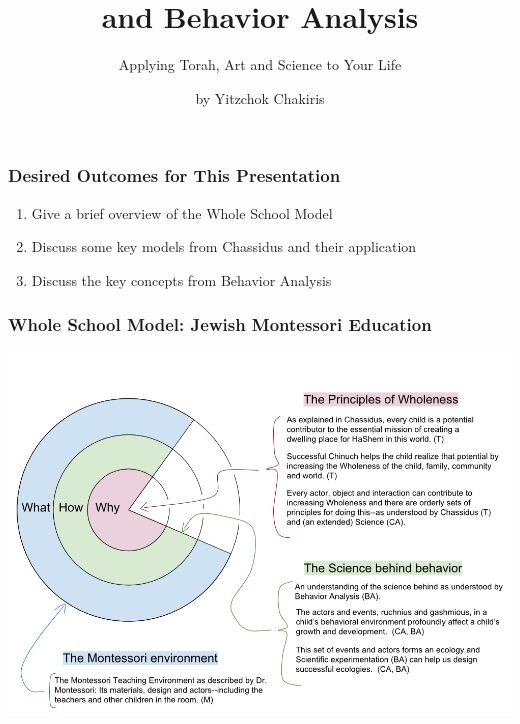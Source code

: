 \documentclass[12pt, handout, notes=show]{beamer}
\title{\Huge{\RL{\sbl חסידות} and Behavior Analysis}}
\subtitle{Applying Torah, Art and Science to Your Life }
\author{by Yitzchok Chakiris}
\date{\RL{\sbl  ה'תשע''ז}}
\begin{document}
\maketitle

\begin{frame}
  \frametitle{Desired Outcomes for This Presentation}
  \begin{enumerate}
  \item Give a brief overview of the Whole School Model

  \item Discuss some key models from Chassidus and their application
  \item Discuss the key concepts from Behavior Analysis

  \end{enumerate}

\end{frame}


\begin{frame}
  \frametitle{Whole School Model: Jewish Montessori Education}
  \begin{center}
      \includegraphics[scale=0.38]{graphics/onion-model-v2.png}
  \end{center}
\end{frame}
\end{document}
